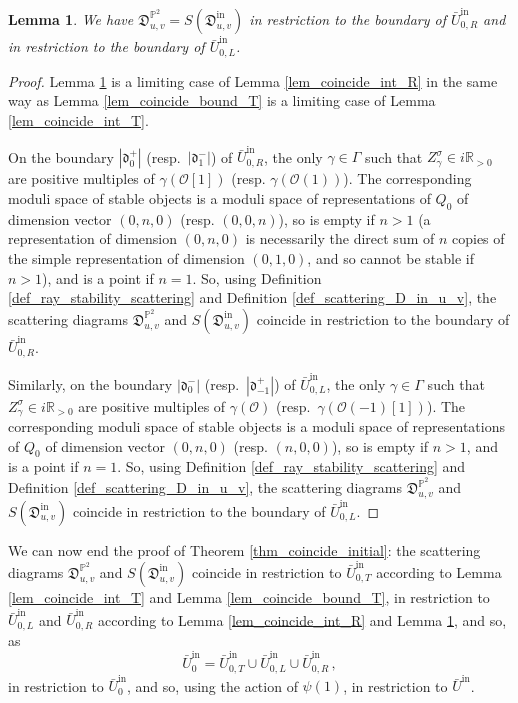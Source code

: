 \documentclass[12pt, a4paper]{amsart}
\newtheorem{lem}[defn]{Lemma}
\newcommand\PP{\mathbb P}
\newcommand\R{\mathbb R}
\newcommand\cO{\mathcal O}
\newcommand\fd{\mathfrak d}
\newcommand\fD{\mathfrak D}
\newcommand\iin{\mathrm{in}}
\begin{document}
\begin{lem} \label{lem_coincide_bound_R}
We have $\fD^{\PP^2}_{u,v}
=S(\fD^\iin_{u,v})$ in restriction to the boundary of $\bar{U}^\iin_{0,R}$ and in restriction to the boundary of 
$\bar{U}^\iin_{0,L}$.
\end{lem}

\begin{proof}
Lemma \ref{lem_coincide_bound_R} is a limiting case of Lemma
\ref{lem_coincide_int_R} in the same way as 
Lemma \ref{lem_coincide_bound_T}
is a limiting case of Lemma 
\ref{lem_coincide_int_T}.

On the boundary $|\fd_0^+|$
(resp.\ $|\fd_1^-|$)
of 
$\bar{U}^\iin_{0,R}$,
 the only $\gamma \in \Gamma$ such that $Z_\gamma^\sigma \in i \R_{>0}$ are positive multiples of 
$\gamma(\cO[1])$ (resp. $\gamma(\cO(1))$).
The corresponding moduli space of stable objects is a moduli space 
of representations of $Q_0$ of dimension vector $(0,n,0)$ (resp. $(0,0,n)$), so is empty if $n>1$
(a representation of dimension $(0,n,0)$ is 
necessarily the direct sum of $n$ copies of the simple representation of dimension $(0,1,0)$, and so cannot be stable if $n>1$), and is a point if $n=1$.
So, using Definition 
\ref{def_ray_stability_scattering}
and Definition \ref{def_scattering_D_in_u_v},
the scattering diagrams $\fD^{\PP^2}_{u,v}$ and $S(\fD^\iin_{u,v})$ coincide in restriction to the boundary of 
$\bar{U}^\iin_{0,R}$.

Similarly, on the boundary $|\fd_0^-|$
(resp.\ $|\fd_{-1}^+|$)
of 
$\bar{U}^\iin_{0,L}$,
 the only $\gamma \in \Gamma$ such that $Z_\gamma^\sigma \in i \R_{>0}$ are positive multiples of 
$\gamma(\cO)$ (resp.\ $\gamma(\cO(-1)[1])$).
The corresponding moduli space of stable objects is a moduli space 
of representations of $Q_0$ of dimension vector $(0,n,0)$ (resp. $(n,0,0)$), so is empty if $n>1$, and is a point if $n=1$.
So, using Definition 
\ref{def_ray_stability_scattering}
and Definition \ref{def_scattering_D_in_u_v},
the scattering diagrams $\fD^{\PP^2}_{u,v}$ and $S(\fD^\iin_{u,v})$ coincide in restriction to the boundary of 
$\bar{U}^\iin_{0,L}$.
\end{proof}

We can now end the proof of Theorem 
\ref{thm_coincide_initial}: the scattering diagrams 
$\fD^{\PP^2}_{u,v}$ and 
$S(\fD^\iin_{u,v})$ coincide in restriction to
$\bar{U}_{0,T}^\iin$ according to Lemma
\ref{lem_coincide_int_T} and Lemma
\ref{lem_coincide_bound_T}, 
in restriction to
$\bar{U}_{0,L}^\iin$ and 
$\bar{U}_{0,R}^\iin$
according to Lemma 
\ref{lem_coincide_int_R} and Lemma
\ref{lem_coincide_bound_R},  and so, as
\[\bar{U}^\iin_0=\bar{U}^\iin_{0,T}
\cup \bar{U}^\iin_{0,L}
\cup \bar{U}^\iin_{0,R}\,,\]
in restriction to $\bar{U}^\iin_0$, and so,
using the action of 
$\psi(1)$, in restriction to $\bar{U}^\iin$.
\end{document}
